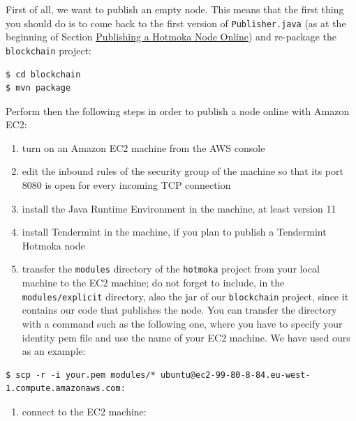 \documentclass[a4paper,]{book}
\providecommand{\tightlist}{%
  \setlength{\itemsep}{0pt}\setlength{\parskip}{0pt}}
\begin{document}
{First of all, we want to publish an empty node. This means that the
first thing you should do is to come back to the first version of
\texttt{Publisher.java} (as at the beginning of Section
\protect\hyperlink{publishing-a-hotmoka-node-online}{Publishing a
Hotmoka Node Online}) and re-package the \texttt{blockchain} project:

\begin{myverbatim}
\begin{verbatim}
$ cd blockchain
$ mvn package
\end{verbatim}
\end{myverbatim}

Perform then the following steps in order to publish a node online with
Amazon EC2:

\begin{enumerate}
\def\labelenumi{\arabic{enumi}.}
\tightlist
\item
  turn on an Amazon EC2 machine from the AWS console
\item
  edit the inbound rules of the security group of the machine so that
  its port 8080 is open for every incoming TCP connection
\item
  install the Java Runtime Environment in the machine, at least version
  11
\item
  install Tendermint in the machine, if you plan to publish a Tendermint
  Hotmoka node
\item
  transfer the \texttt{modules} directory of the \texttt{hotmoka}
  project from your local machine to the EC2 machine; do not forget to
  include, in the \texttt{modules/explicit} directory, also the jar of
  our \texttt{blockchain} project, since it contains our code that
  publishes the node. You can transfer the directory with a command such
  as the following one, where you have to specify your identity pem file
  and use the name of your EC2 machine. We have used ours as an example:
\end{enumerate}

\begin{myverbatim}
\begin{verbatim}
$ scp -r -i your.pem modules/* ubuntu@ec2-99-80-8-84.eu-west-1.compute.amazonaws.com:
\end{verbatim}
\end{myverbatim}

\begin{enumerate}
\def\labelenumi{\arabic{enumi}.}
\setcounter{enumi}{5}
\tightlist
\item
  connect to the EC2 machine:
\end{enumerate}

}
\end{document}
